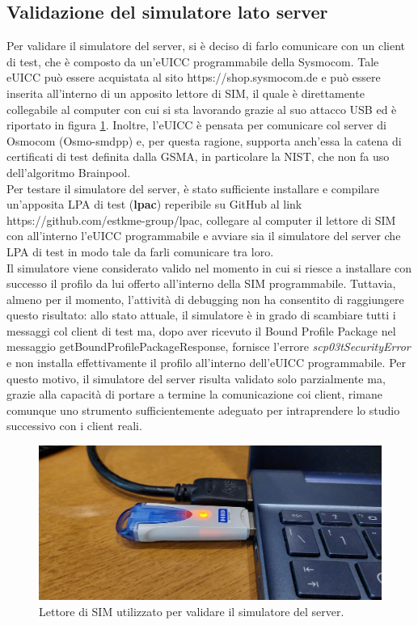 \documentclass[10pt, oneside]{book}
\begin{document}
\subsection{Validazione del simulatore lato server}
Per validare il simulatore del server, si è deciso di farlo comunicare con un client di test, che è composto da un'eUICC programmabile della Sysmocom. Tale eUICC può essere acquistata al sito https://shop.sysmocom.de e può essere inserita all'interno di un apposito lettore di SIM, il quale è direttamente collegabile al computer con cui si sta lavorando grazie al suo attacco USB ed è riportato in figura \ref{fig:eUICC-reader}. Inoltre, l'eUICC è pensata per comunicare col server di Osmocom (Osmo-smdpp) e, per questa ragione, supporta anch'essa la catena di certificati di test definita dalla GSMA, in particolare la NIST, che non fa uso dell'algoritmo Brainpool.\\
Per testare il simulatore del server, è stato sufficiente installare e compilare un'apposita LPA di test (\textbf{lpac}) reperibile su GitHub al link https://github.com/estkme-group/lpac, collegare al computer il lettore di SIM con all'interno l'eUICC programmabile e avviare sia il simulatore del server che LPA di test in modo tale da farli comunicare tra loro.\\
Il simulatore viene considerato valido nel momento in cui si riesce a installare con successo il profilo da lui offerto all'interno della SIM programmabile. Tuttavia, almeno per il momento, l'attività di debugging non ha consentito di raggiungere questo risultato: allo stato attuale, il simulatore è in grado di scambiare tutti i messaggi col client di test ma, dopo aver ricevuto il Bound Profile Package nel messaggio getBoundProfilePackageResponse, fornisce l'errore \textit{scp03tSecurityError} e non installa effettivamente il profilo all'interno dell'eUICC programmabile. Per questo motivo, il simulatore del server risulta validato solo parzialmente ma, grazie alla capacità di portare a termine la comunicazione coi client, rimane comunque uno strumento sufficientemente adeguato per intraprendere lo studio successivo con i client reali.
\begin{figure}
\includegraphics[width=\linewidth]{eUICC-reader.png}
\caption{Lettore di SIM utilizzato per validare il simulatore del server.}
\label{fig:eUICC-reader}
\end{figure}
\end{document}
